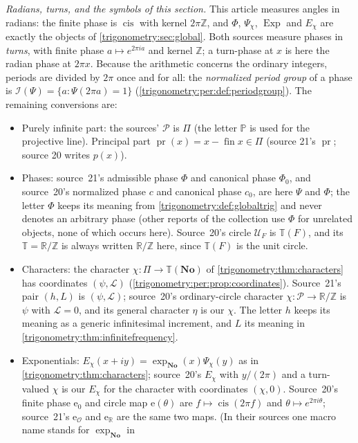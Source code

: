 \documentclass[11pt,letterpaper]{article}
\numberwithin{equation}{section}
\theoremstyle{definition}
\theoremstyle{remark}
\newcommand{\No}{\mathbf{No}}
\newcommand{\R}{\mathbb R}
\newcommand{\Z}{\mathbb Z}
\newcommand{\OO}{\mathcal O}
\newcommand{\TT}{\mathbb T}
\newcommand{\PP}{\mathbb P}
\newcommand{\fin}{\operatorname{fin}}
\newcommand{\cis}{\operatorname{cis}}
\newcommand{\Exp}{\operatorname{Exp}}
\newcommand{\pr}{\operatorname{pr}}
\newcommand{\cI}{\mathcal I}
\newcommand{\cL}{\mathcal L}
\begin{document}
\emph{Radians, turns, and the symbols of this section.} This article measures angles in radians: the
finite phase is $\cis$ with kernel $2\pi\Z$, and $\Phi$, $\Psi_\chi$, $\Exp$ and $E_\chi$ are exactly the
objects of \cref{trigonometry:sec:global}. Both sources measure phases in \emph{turns}, with finite phase
$a\mapsto e^{2\pi ia}$ and kernel $\Z$; a turn-phase at $x$ is here the radian phase at $2\pi x$. Because
the arithmetic concerns the ordinary integers, periods are divided by $2\pi$ once and for all: the
\emph{normalized period group} of a phase is $\cI(\Psi)=\{a:\Psi(2\pi a)=1\}$
(\cref{trigonometry:per:def:periodgroup}). The remaining conversions are:
\begin{itemize}
\item Purely infinite part: the sources' $\mathcal P$ is $\Pi$ (the letter $\PP$ is used for the
 projective line). Principal part $\pr(x)=x-\fin x\in\Pi$ (source 21's $\operatorname{pr}$; source 20
 writes $p(x)$).
\item Phases: source~21's admissible phase $\Phi$ and canonical phase $\Phi_0$, and source~20's
 normalized phase $c$ and canonical phase $c_0$, are here $\Psi$ and $\Phi$; the letter $\Phi$ keeps
 its meaning from \cref{trigonometry:def:globaltrig} and never denotes an arbitrary phase (other
 reports of the collection use $\Phi$ for unrelated objects, none of which occurs here). Source~20's circle $\mathcal U_F$ is $\TT(F)$, and its
 $\TT=\R/\Z$ is always written $\R/\Z$ here, since $\TT(F)$ is the unit circle.
\item Characters: the character $\chi:\Pi\to\TT(\No)$ of \cref{trigonometry:thm:characters} has
 coordinates $(\psi,\cL)$ (\cref{trigonometry:per:prop:coordinates}). Source~21's pair $(h,L)$ is
 $(\psi,\cL)$; source~20's ordinary-circle character $\chi:\mathcal P\to\R/\Z$ is $\psi$ with
 $\cL=0$, and its general character $\eta$ is our $\chi$. The letter $h$ keeps its meaning as a generic
 infinitesimal increment, and $L$ its meaning in \cref{trigonometry:thm:infinitefrequency}.
\item Exponentials: $E_\chi(x+iy)=\exp_{\No}(x)\Psi_\chi(y)$ as in \cref{trigonometry:thm:characters};
 source~20's $E_\chi$ with $y/(2\pi)$ and a turn-valued $\chi$ is our $E_\chi$ for the character with
 coordinates $(\chi,0)$. Source~20's finite phase $\mathrm e_0$ and circle map $\mathrm e(\theta)$ are
 $f\mapsto\cis(2\pi f)$ and $\theta\mapsto e^{2\pi i\theta}$; source~21's $\mathrm e_{\OO}$ and
 $\mathrm e_{\R}$ are the same two maps. (In their sources one macro name stands for $\exp_{\No}$ in

\end{itemize}
\end{document}
